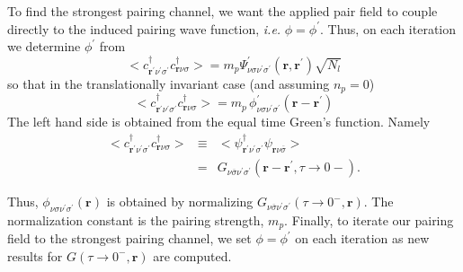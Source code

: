 To find the strongest pairing channel, we want the applied
pair field to couple directly to the induced pairing wave function,
\textit{i.e.} $\phi = \phi^{\prime}$.  Thus, on each iteration
we determine $\phi^{\prime}$ from
\begin{equation}
<c^{\dagger}_{\mathbf{r}^{\prime}\nu^{\prime}\sigma^{\prime}} 
c^{\dagger}_{\mathbf{r}\nu\sigma}> = 
m_p \Psi^{\prime}_{\nu\sigma\nu^{\prime}\sigma^{\prime}}(\mathbf{r},\mathbf{r}^{\prime}) \sqrt{N_l}
\end{equation}
so that in the translationally invariant case (and assuming
$n_p = 0$)
\begin{equation} 
<c^{\dagger}_{\mathbf{r}^{\prime}\nu^{\prime}\sigma^{\prime}} 
c^{\dagger}_{\mathbf{r}\nu\sigma}>  =  m_p 
\,\phi_{\nu\sigma\nu^{\prime}\sigma^{\prime}}^{\prime}(\mathbf{r} -
\mathbf{r}^{\prime}) 
\end{equation}
The left hand side is obtained from the equal time Green's
function.  Namely
\begin{eqnarray} 
<c^{\dagger}_{\mathbf{r}^{\prime}\nu^{\prime}\sigma^{\prime}} 
c^{\dagger}_{\mathbf{r}\nu\sigma}> & \equiv &
<\psi^{\dagger}_{\mathbf{r}^{\prime}\nu^{\prime}\sigma^{\prime}}
\psi_{\mathbf{r}\nu\overline{\sigma}}> \\
& = & 
G_{\nu\overline{\sigma}\nu^{\prime}\sigma^{\prime}}(\mathbf{r}-\mathbf{r}^{\prime},
\tau \to 0-).
\end{eqnarray}

Thus, $\phi_{\nu\sigma\nu^{\prime}\sigma^{\prime}}(\mathbf{r})$ 
is obtained by normalizing  
$G_{\nu\overline{\sigma}\nu^{\prime}\sigma^{\prime}}(\tau \to 0^-, \mathbf{r})$.
The normalization constant is the pairing strength, $m_p$.
Finally, to iterate our pairing field 
to the strongest pairing channel, we set
$\phi = \phi^{\prime}$ on each iteration
as new results for $G(\tau \to 0^-, \mathbf{r})$
are computed.  
